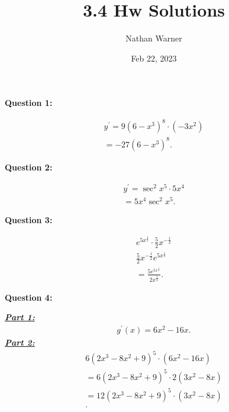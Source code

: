 \documentclass{report}
\title{\Huge{3.4 Hw Solutions}}
\author{\huge{Nathan Warner}}
\date{\huge{Feb 22, 2023}}
\begin{document}
    \maketitle
    \begin{Large}
        \noindent \textbf{Question 1:}
    \end{Large}
    \bigbreak \noindent 
    \bigbreak \noindent 
    \begin{align*}
        y^{\prime} = 9(6-x^3)^{8} \cdot (-3x^{2}) \\
        = -27(6-x^{3})^{8}
    .\end{align*}

    \bigbreak \noindent \bigbreak \noindent 
    \begin{Large}
        \textbf{Question 2:}
    \end{Large}
    \bigbreak \noindent 
    \bigbreak \noindent 
    \begin{align*}
        y^{\prime} = \sec^{2}{x^{5}} \cdot 5x^{4} \\ 
        = 5x^{4}\sec^{2}{x^{5}}
    .\end{align*}

    \bigbreak \noindent \bigbreak \noindent 
    \begin{Large}
        \textbf{Question 3:}
    \end{Large}
    \bigbreak \noindent 
    \bigbreak \noindent 
    \begin{align*}
        e^{5x^{\frac{1}{2}}} \cdot \frac{5}{2}x^{-\frac{1}{2}} \\
        \frac{5}{2}x^{-\frac{1}{2}}e^{5x^{\frac{1}{2}}} \\
        = \frac{5e^{5x^{\frac{1}{2}}}}{2x^{\frac{1}{2}}}
    .\end{align*}

    \bigbreak \noindent \bigbreak \noindent 
    \begin{Large}
        \textbf{Question 4:}
    \end{Large}
    \bigbreak \noindent 
    \bigbreak \noindent 
    \textbf{\textit{\underline{Part 1:}}}
    \begin{align*}
        g^{\prime}(x) = 6x^2-16x 
    .\end{align*}
    \bigbreak \noindent 
    \textbf{\textit{\underline{Part 2:}}}
    \begin{align*}
        6(2x^{3}-8x^{2}+9)^5 \cdot (6x^{2}-16x) \\
        = 6(2x^{3}-8x^{2}+9)^5 \cdot 2(3x^{2}-8x) \\
        = 12(2x^{3}-8x^{2}+9)^5 \cdot (3x^{2}-8x) \\
    .\end{align*}
\end{document}
